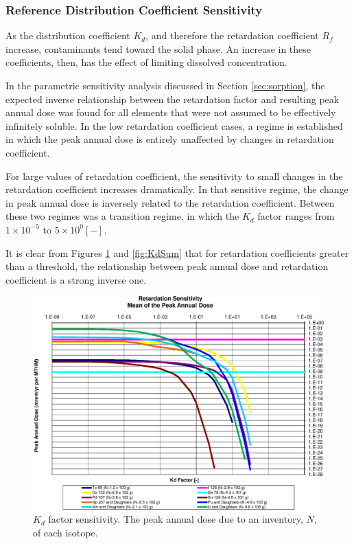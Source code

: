 
\subsubsection{Reference Distribution Coefficient Sensitivity}

As the distribution coefficient $K_d$, and therefore the retardation 
coefficient $R_f$ increase, contaminants tend toward the solid phase. An 
increase in these coefficients, then, has the effect of limiting dissolved 
concentration.  

In the parametric sensitivity analysis discussed in Section \ref{sec:sorption}, 
the expected inverse relationship between the retardation factor and resulting 
peak annual dose was found for all elements that were not assumed to be 
effectively infinitely soluble.  In the low retardation coefficient cases, a 
regime is established in which the peak annual dose is entirely unaffected by 
changes in retardation coefficient. 

For large values of retardation coefficient, the sensitivity to small changes 
in the retardation coefficient increases dramatically. In that sensitive 
regime, the change in peak annual dose is inversely related to the retardation 
coefficient. Between these two regimes was a transition regime, in which the 
$K_d$ factor ranges from $1\times10^{-5}$ to $5\times10^{0} [-]$.

It is clear from Figures \ref{fig:KdSumFactor} and \ref{fig:KdSum} that 
for retardation coefficients greater than a threshold, the 
relationship between peak annual dose and retardation coefficient is a strong 
inverse one. 

\begin{figure}[ht]
\centering
\includegraphics[width=0.7\linewidth]{./chapters/nuclide_sensitivity/clay/Sorption/Retardation_Summary_kdFactor.eps}
\caption{$K_d$ factor sensitivity.  The peak annual dose due to an inventory, 
$N$, of each isotope.}
\label{fig:KdSumFactor}
\end{figure}

